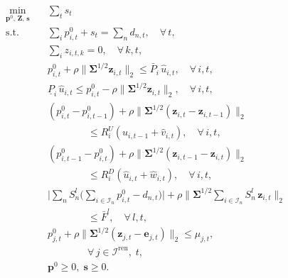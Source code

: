 \documentclass[journal]{IEEEtran}
\begin{document}
\begin{subequations}\label{eq:phase2}
\begin{align}
\min_{\mathbf{p}^0,\,\mathbf{Z},\,\mathbf{s}} \quad
& \sum_t s_t
  \label{eq:phase2_obj} \\[3pt]
\text{s.t.}\quad
& \sum_{i} p_{i,t}^0 + s_t = \sum_n d_{n,t},
  \quad \forall\, t,
  \label{eq:phase2_bal_nom} \\
& \sum_{i} z_{i,t,k} = 0,
  \quad \forall\, k,t,
  \label{eq:phase2_bal_rec} \\
& p_{i,t}^0
  + \rho \lVert \boldsymbol{\Sigma}^{1/2} \mathbf{z}_{i,t} \rVert_2
  \leq \bar{P}_i\, \hat{u}_{i,t},
  \quad \forall\, i,t,
  \label{eq:phase2_cap_up} \\
& \underline{P}_i\, \hat{u}_{i,t}
  \leq p_{i,t}^0
  - \rho \lVert \boldsymbol{\Sigma}^{1/2} \mathbf{z}_{i,t} \rVert_2,
  \quad \forall\, i,t,
  \label{eq:phase2_cap_lo} \\
& (p_{i,t}^0 - p_{i,t-1}^0)
  + \rho \lVert \boldsymbol{\Sigma}^{1/2}
    (\mathbf{z}_{i,t} - \mathbf{z}_{i,t-1}) \rVert_2
  \nonumber\\
& \qquad\qquad
  \leq R_i^U (\hat{u}_{i,t-1} + \hat{v}_{i,t}),
  \quad \forall\, i,t,
  \label{eq:phase2_ramp_up} \\
& (p_{i,t-1}^0 - p_{i,t}^0)
  + \rho \lVert \boldsymbol{\Sigma}^{1/2}
    (\mathbf{z}_{i,t-1} - \mathbf{z}_{i,t}) \rVert_2
  \nonumber\\
& \qquad\qquad
  \leq R_i^D (\hat{u}_{i,t} + \hat{w}_{i,t}),
  \quad \forall\, i,t,
  \label{eq:phase2_ramp_dn} \\
& \Big|\sum_n S_n^l
  \Big(\sum_{i \in \mathcal{I}_n} p_{i,t}^0 - d_{n,t}\Big)\Big|
  + \rho \Big\lVert \boldsymbol{\Sigma}^{1/2}
    \sum_{i \in \mathcal{I}_n} S_n^l\, \mathbf{z}_{i,t}
  \Big\rVert_2
  \nonumber\\
& \qquad\qquad
  \leq \bar{F}^l,
  \quad \forall\, l,t,
  \label{eq:phase2_flow} \\
& p_{j,t}^0
  + \rho \lVert \boldsymbol{\Sigma}^{1/2}
    (\mathbf{z}_{j,t} - \mathbf{e}_{j,t}) \rVert_2
  \leq \mu_{j,t},
  \nonumber\\
& \qquad\qquad
  \forall\, j \in \mathcal{I}^{\text{ren}},\; t,
  \label{eq:phase2_ren} \\
& \mathbf{p}^0 \geq 0,\; \mathbf{s} \geq 0.
  \label{eq:phase2_domain}
\end{align}
\end{subequations}
\end{document}
